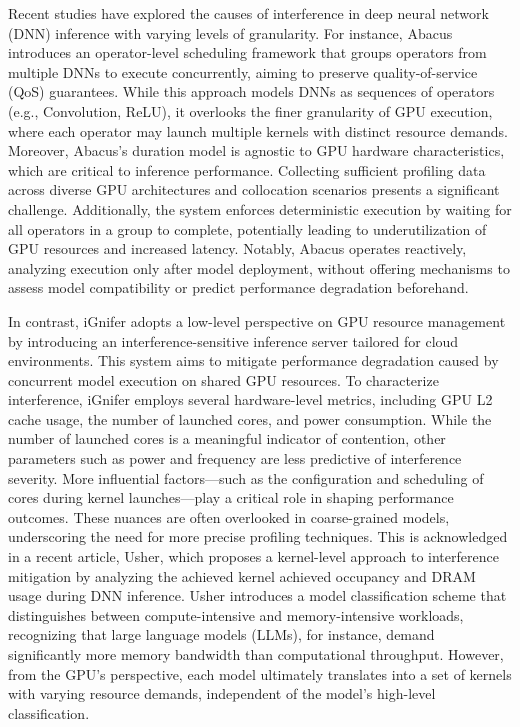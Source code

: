 Recent studies have explored the causes of interference in deep neural network (DNN) inference with varying levels of granularity. For instance, Abacus introduces an operator-level scheduling framework that groups operators from multiple DNNs to execute concurrently, aiming to preserve quality-of-service (QoS) guarantees. While this approach models DNNs as sequences of operators (e.g., Convolution, ReLU), it overlooks the finer granularity of GPU execution, where each operator may launch multiple kernels with distinct resource demands. Moreover, Abacus's duration model is agnostic to GPU hardware characteristics, which are critical to inference performance. Collecting sufficient profiling data across diverse GPU architectures and collocation scenarios presents a significant challenge. Additionally, the system enforces deterministic execution by waiting for all operators in a group to complete, potentially leading to underutilization of GPU resources and increased latency. Notably, Abacus operates reactively, analyzing execution only after model deployment, without offering mechanisms to assess model compatibility or predict performance degradation beforehand.

In contrast, iGnifer adopts a low-level perspective on GPU resource management by introducing an interference-sensitive inference server tailored for cloud environments. This system aims to mitigate performance degradation caused by concurrent model execution on shared GPU resources. To characterize interference, iGnifer employs several hardware-level metrics, including GPU L2 cache usage, the number of launched cores, and power consumption. While the number of launched cores is a meaningful indicator of contention, other parameters such as power and frequency are less predictive of interference severity. More influential factors—such as the configuration and scheduling of cores during kernel launches—play a critical role in shaping performance outcomes. These nuances are often overlooked in coarse-grained models, underscoring the need for more precise profiling techniques.
This is acknowledged in a recent article, Usher, which proposes a kernel-level approach to interference mitigation by analyzing the achieved kernel achieved occupancy and DRAM usage during DNN inference. Usher introduces a model classification scheme that distinguishes between compute-intensive and memory-intensive workloads, recognizing that large language models (LLMs), for instance, demand significantly more memory bandwidth than computational throughput. However, from the GPU's perspective, each model ultimately translates into a set of kernels with varying resource demands, independent of the model's high-level classification.

